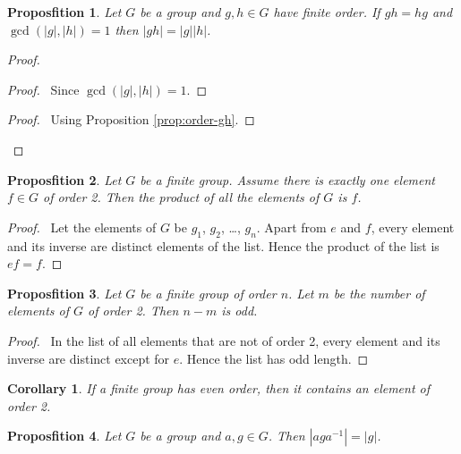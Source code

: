 \documentclass{book}
\let\qed\relax
\newtheorem{prop}{Proposfition}[chapter]
\newtheorem{cor}{Corollary}[prop]
\theoremstyle{definition}
\newcommand{\inv}[1]{\ensuremath{{#1}^{-1}}}
\begin{document}
\begin{prop}
    \label{prop:order-gh-if-gcd-one}
    Let $G$ be a group and $g,h \in G$ have finite order. If $gh=hg$ and $\gcd(|g|,|h|) = 1$ then $|gh| = |g||h|$.
\end{prop}

\begin{proof}
    \pf
    \step{2}{$g^N = (\inv{h})^N$}
    \begin{proof}
        \pf\ Since $\gcd(|g|,|h|) = 1$.
    \end{proof}
    \begin{proof}
        \pf\ Using Proposition \ref{prop:order-gh}.
    \end{proof}
    \qed
\end{proof}

\begin{prop}
    \label{prop:product-of-all-elements}
    Let $G$ be a finite group. Assume there is exactly one element $f \in G$ of order 2. Then the product of all the elements of $G$ is $f$.
\end{prop}

\begin{proof}
    \pf\ Let the elements of $G$ be $g_1$, $g_2$, \ldots, $g_n$. Apart from $e$ and $f$, every element and its inverse are distinct elements of the list. Hence the product of the list is $ef = f$. \qed
\end{proof}

\begin{prop}
    Let $G$ be a finite group of order $n$. Let $m$ be the number of elements of $G$ of order 2. Then $n-m$ is odd.
\end{prop}

\begin{proof}
    \pf\ In the list of all elements that are not of order 2, every element and its inverse are distinct except for $e$. Hence the list has odd length. \qed
\end{proof}

\begin{cor}
    If a finite group has even order, then it contains an element of order 2.
\end{cor}

\begin{prop}
    Let $G$ be a group and $a,g \in G$. Then $|ag\inv{a}| = |g|$.
\end{prop}
\end{document}

